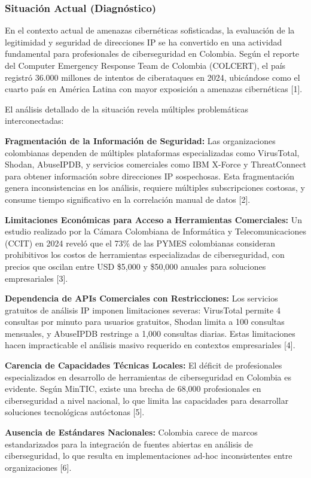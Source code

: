 \subsubsection{Situación Actual (Diagnóstico)}
En el contexto actual de amenazas cibernéticas sofisticadas, la evaluación de la legitimidad y seguridad de direcciones IP se ha convertido en una actividad fundamental para profesionales de ciberseguridad en Colombia. Según el reporte del Computer Emergency Response Team de Colombia (COLCERT), el país registró 36.000 millones de intentos de ciberataques en 2024, ubicándose como el cuarto país en América Latina con mayor exposición a amenazas cibernéticas [1].

El análisis detallado de la situación revela múltiples problemáticas interconectadas:

\textbf{Fragmentación de la Información de Seguridad:}
Las organizaciones colombianas dependen de múltiples plataformas especializadas como VirusTotal, Shodan, AbuseIPDB, y servicios comerciales como IBM X-Force y ThreatConnect para obtener información sobre direcciones IP sospechosas. Esta fragmentación genera inconsistencias en los análisis, requiere múltiples subscripciones costosas, y consume tiempo significativo en la correlación manual de datos [2].

\textbf{Limitaciones Económicas para Acceso a Herramientas Comerciales:}
Un estudio realizado por la Cámara Colombiana de Informática y Telecomunicaciones (CCIT) en 2024 reveló que el 73\% de las PYMES colombianas consideran prohibitivos los costos de herramientas especializadas de ciberseguridad, con precios que oscilan entre USD \$5,000 y \$50,000 anuales para soluciones empresariales [3].

\textbf{Dependencia de APIs Comerciales con Restricciones:}
Los servicios gratuitos de análisis IP imponen limitaciones severas: VirusTotal permite 4 consultas por minuto para usuarios gratuitos, Shodan limita a 100 consultas mensuales, y AbuseIPDB restringe a 1,000 consultas diarias. Estas limitaciones hacen impracticable el análisis masivo requerido en contextos empresariales [4].

\textbf{Carencia de Capacidades Técnicas Locales:}
El déficit de profesionales especializados en desarrollo de herramientas de ciberseguridad en Colombia es evidente. Según MinTIC, existe una brecha de 68,000 profesionales en ciberseguridad a nivel nacional, lo que limita las capacidades para desarrollar soluciones tecnológicas autóctonas [5].

\textbf{Ausencia de Estándares Nacionales:}
Colombia carece de marcos estandarizados para la integración de fuentes abiertas en análisis de ciberseguridad, lo que resulta en implementaciones ad-hoc inconsistentes entre organizaciones [6].

